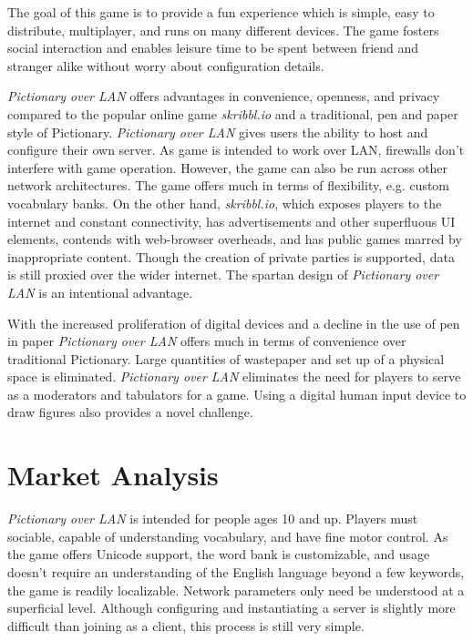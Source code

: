 \documentclass[12pt,letterpaper]{article}
\begin{document}
The goal of this game is to provide a fun experience which is simple, easy to distribute, multiplayer, and runs on many different devices. The game fosters social interaction and enables leisure time to be spent between friend and stranger alike without worry about configuration details.

\textit{Pictionary over LAN} offers advantages in convenience, openness, and privacy compared to the popular online game \textit{skribbl.io} and a traditional, pen and paper style of Pictionary. \textit{Pictionary over LAN} gives users the ability to host and configure their own server. As game is intended to work over LAN, firewalls don't interfere with game operation. However, the game can also be run across other network architectures. The game offers much in terms of flexibility, e.g. custom vocabulary banks. On the other hand, \textit{skribbl.io}, which exposes players to the internet and constant connectivity, has advertisements and other superfluous UI elements, contends with web-browser overheads, and has public games marred by inappropriate content. Though the creation of private parties is supported, data is still proxied over the wider internet. The spartan design of \textit{Pictionary over LAN} is an intentional advantage.

With the increased proliferation of digital devices and a decline in the use of pen in paper \textit{Pictionary over LAN} offers much in terms of convenience over traditional Pictionary. Large quantities of wastepaper and set up of a physical space is eliminated. \textit{Pictionary over LAN} eliminates the need for players to serve as a moderators and tabulators for a game. Using a digital human input device to draw figures also provides a novel challenge.


\section*{Market Analysis}

\textit{Pictionary over LAN} is intended for people ages 10 and up. Players must sociable, capable of understanding vocabulary, and have fine motor control. As the game offers Unicode support, the word bank is customizable, and usage doesn’t require an understanding of the English language beyond a few keywords, the game is readily localizable. Network parameters only need be understood at a superficial level. Although configuring and instantiating a server is slightly more difficult than joining as a client, this process is still very simple. 
\end{document}
